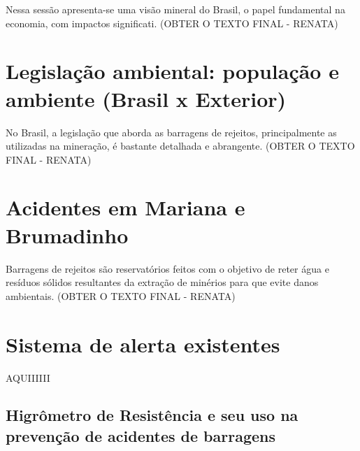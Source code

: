 Nessa sessão apresenta-se uma visão mineral do Brasil, o papel
fundamental na economia, com impactos significati. (OBTER O TEXTO
FINAL - RENATA)

\section{Legislação ambiental: população e ambiente (Brasil x Exterior)}
\label{sec:legislacao}

No Brasil, a legislação que aborda as barragens de rejeitos,
principalmente as utilizadas na mineração, é bastante detalhada e
abrangente. (OBTER O TEXTO FINAL - RENATA)

\section{Acidentes em Mariana e Brumadinho}
\label{sec:acidentes}

Barragens de rejeitos são reservatórios feitos com o objetivo de reter
água e resíduos sólidos resultantes da extração de minérios para que
evite danos ambientais. (OBTER O TEXTO FINAL - RENATA)

\section{Sistema de alerta existentes}
\label{sec:sistema_alerta}

AQUIIIIII

\subsection{Higrômetro de Resistência e seu uso na prevenção de acidentes de barragens}
\label{subsec:higrometro}